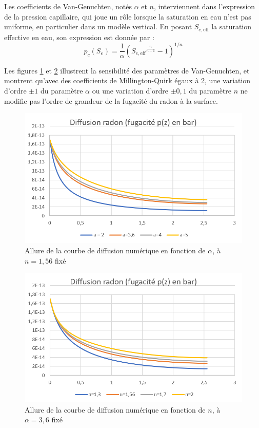 \documentclass{article}
\begin{document}
Les coefficients de Van-Genuchten, notés $\alpha$ et $n$, interviennent dans l’expression de la pression capillaire, qui joue un rôle lorsque la saturation en eau n’est pas uniforme, en particulier dans un modèle vertical. En posant $S_{e,\text{eff}}$ la saturation effective en eau, son expression est donnée par :
$$
p_c (S_e)= \dfrac{1}{\alpha} \left( {S_{e,\text{eff}} }^{\frac{n}{n-1}} -1 \right)^{1/n}
$$

Les figures \ref{fig:sens_hytec_alpha} et \ref{fig:sens_hytec_n} illustrent la sensibilité des paramètres de Van-Genuchten, et montrent qu'avec des coefficients de Millington-Quirk égaux à 2, une variation d’ordre $\pm 1$ du paramètre $\alpha$ ou une variation d’ordre $\pm 0,1$ du paramètre $n$ ne modifie pas l’ordre de grandeur de la fugacité du radon à la surface.

\begin{figure}[H]
    \centering
    \includegraphics[width = 12 cm]{III_C_11.png}
    \caption{Allure de la courbe de diffusion numérique en fonction de $\alpha$, à $n=1,56$ fixé}
    \label{fig:sens_hytec_alpha}
\end{figure}
\begin{figure}[H]
    \centering
    \includegraphics[width = 12 cm ]{III_C_12.png}
    \caption{Allure de la courbe de diffusion numérique en fonction de $n$, à $\alpha=3,6$ fixé}
    \label{fig:sens_hytec_n}
\end{figure}
\end{document}
